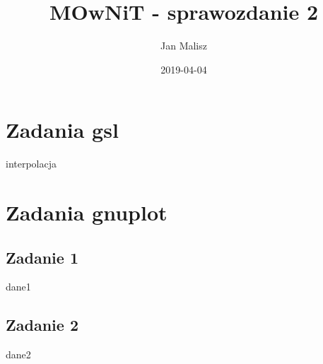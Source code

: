 \documentclass[10pt,a4paper]{article}
\title{MOwNiT - sprawozdanie 2}
\author{Jan Malisz}
\date{2019-04-04}
\begin{document}
  \maketitle
  \thispagestyle{empty}

  \newpage
  \section*{Zadania gsl}\label{sec:ZadaniaGsl}
  {interpolacja}

  \newpage
  \section*{Zadania gnuplot}\label{sec:ZadaniaGnuplot}
  \subsection*{Zadanie 1}\label{sec:Zadanie1}
  {dane1}
  \newpage
  \subsection*{Zadanie 2}\label{sec:Zadanie2}
  {dane2}
\end{document}
